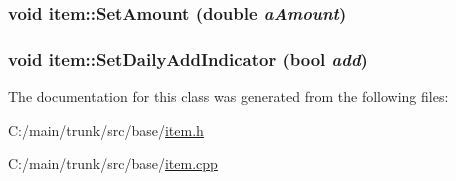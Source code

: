 \label{classitem_a68fcb42c6712e5eb6fd73b7cddefbd93}
\hypertarget{classitem_a13510028580153ac47bbf573883c99f4}{
\subsubsection[{SetAmount}]{\setlength{\rightskip}{0pt plus 5cm}void item::SetAmount (double {\em aAmount})}}
\label{classitem_a13510028580153ac47bbf573883c99f4}
\hypertarget{classitem_a6356f02f08d20f2c06ad0fd5f0432e01}{
\subsubsection[{SetDailyAddIndicator}]{\setlength{\rightskip}{0pt plus 5cm}void item::SetDailyAddIndicator (bool {\em add})}}
\label{classitem_a6356f02f08d20f2c06ad0fd5f0432e01}


The documentation for this class was generated from the following files:\begin{DoxyCompactItemize}
\item 
C:/main/trunk/src/base/\hyperlink{item_8h}{item.h}\item 
C:/main/trunk/src/base/\hyperlink{item_8cpp}{item.cpp}\end{DoxyCompactItemize}
